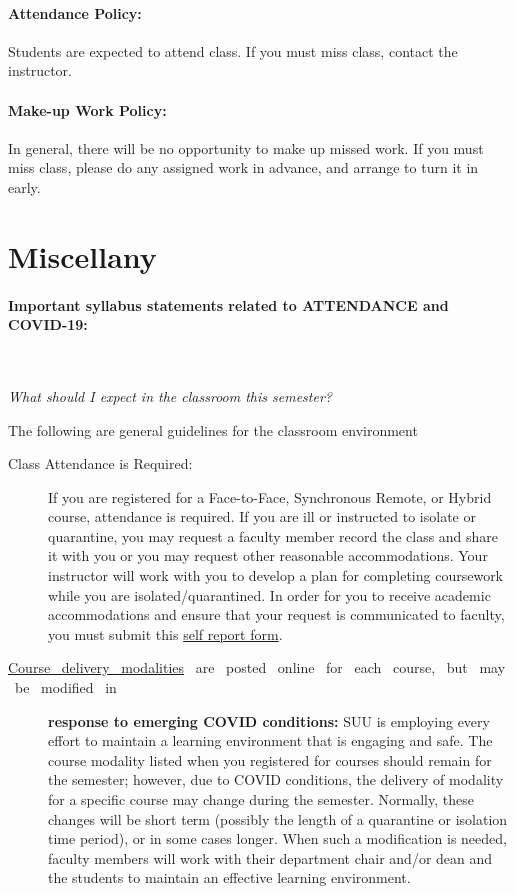 \documentclass[12pt, letterpaper]{article}
\begin{document}
\paragraph{Attendance Policy:}
Students are expected to attend class. If you must miss class, contact the instructor.

\paragraph{Make-up Work Policy:}
In general, there will be no opportunity to make up missed work. If you must miss class, please do any assigned work in advance, and arrange to turn it in early.

\section*{Miscellany}

\paragraph{Important syllabus statements related to ATTENDANCE and COVID-19:} ~

\noindent\emph{What should I expect in the classroom this semester?}

\noindent The following are general guidelines for the classroom environment
\begin{description}
	\item[Class Attendance is Required:] If you are registered for a Face-to-Face, Synchronous Remote, or Hybrid course, attendance is required. If you are ill or instructed to isolate or quarantine, you may request a faculty member record the class and share it with you or you may request other reasonable accommodations. Your instructor will work with you to develop a plan for completing coursework while you are isolated/quarantined. In order for you to receive academic accommodations and ensure that your request is communicated to faculty, you must submit this \href{https://my.suu.edu/covid/selfreport/}{self report form}.
	\item[\href{https://www.suu.edu/registrar/onlinehybrid.html}{Course ~delivery ~modalities} ~are ~posted ~online ~for ~each ~course, ~but ~may ~be ~modified ~in] \textbf{response to emerging COVID conditions:} SUU is employing every effort to maintain a learning environment that is engaging and safe. The course modality listed when you registered for courses should remain for the semester; however, due to COVID conditions, the delivery of modality for a specific course may change during the semester. Normally, these changes will be short term (possibly the length of a quarantine or isolation time period), or in some cases longer. When such a modification is needed, faculty members will work with their department chair and/or dean and the students to maintain an effective learning environment.
\end{description}
\end{document}

